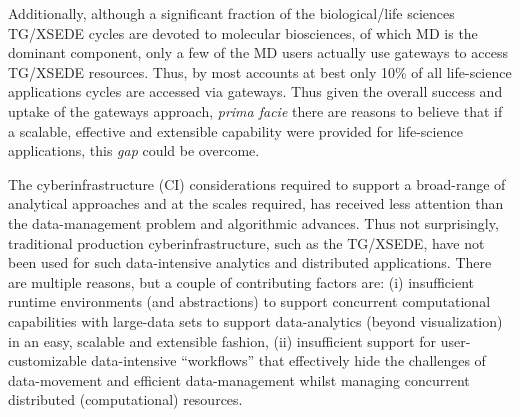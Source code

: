 \documentclass[]{svjour3}
\begin{document}
Additionally, although a significant fraction of the biological/life
sciences TG/XSEDE cycles are devoted to molecular biosciences, of
which MD is the dominant component, only a few of the MD users
actually use gateways to access TG/XSEDE resources. Thus, by most accounts
at best only 10\% of all life-science applications cycles are accessed
via gateways.  %
Thus given the overall success and uptake of the gateways approach,
{\it prima facie} there are reasons to believe that if a scalable,
effective and extensible capability were provided for life-science
applications, this {\it gap} could be overcome.


 

The cyberinfrastructure (CI) considerations required to support a
broad-range of analytical approaches and at the scales required, has
received less attention than the data-management problem and
algorithmic advances. Thus not surprisingly, traditional production
cyberinfrastructure, such as the TG/XSEDE, have not been used for such
data-intensive analytics and distributed applications. There are
multiple reasons, but a couple of contributing factors are: (i)
insufficient runtime environments (and abstractions) to support
concurrent computational capabilities with large-data sets to support
data-analytics (beyond visualization) in an easy, scalable and
extensible fashion, (ii) insufficient support for user-customizable
data-intensive ``workflows'' that effectively hide the challenges of
data-movement and efficient data-management whilst managing concurrent
distributed (computational) resources.
\end{document}
